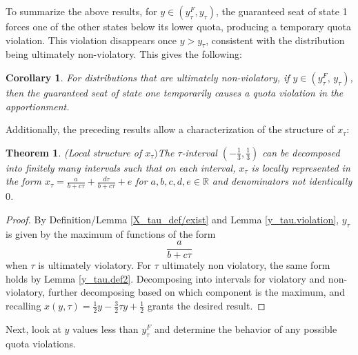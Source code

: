 \documentclass[11pt]{article}
\newtheorem{theorem}{Theorem}[section]
\newtheorem{corollary}{Corollary}[theorem]
\theoremstyle{definition}
\theoremstyle{definition}
\begin{document}
\noindent
To summarize the above results, for $y \in (y_\tau^F, y_\tau)$, the guaranteed seat of state 1 forces one of the other states below its lower quota, producing a temporary quota violation. This violation disappears once $y > y_\tau$, consistent with the distribution being ultimately non-violatory. This gives the following:

\begin{corollary}\label{J_t_c}
For distributions that are ultimately non-violatory, if $y \in (y_\tau^F, \,y_\tau)$, then the guaranteed seat of state one temporarily causes a quota violation in the apportionment.
\end{corollary}

Additionally, the preceding results allow a characterization of the structure of $x_\tau$:
\begin{theorem}(Local structure of $x_\tau)$\label{for_remark}
The $\tau$-interval $(-\frac{1}{3}, \frac{1}{3})$ can be decomposed into  finitely many intervals such that on each interval, $x_\tau$ is locally represented in the form $x_\tau =\frac{a}{b+c\tau} + \frac{d\tau}{b+c\tau} + e$ for $a,b,c,d,e \in \mathbb{R}$ and denominators not identically $0$.
\end{theorem}
\begin{proof}
By Definition/Lemma \ref{X_tau_def/exist} and Lemma \ref{y_tau.violation}, $y_\tau$ is given by the maximum of functions of the form
\[ \frac{a}{b+c\tau} \]
when $\tau$ is ultimately violatory. For $\tau$ ultimately non violatory, the same form holds by Lemma \ref{y_tau.def2}. Decomposing into intervals for violatory and non-violatory, further decomposing based on which component is the maximum, and recalling $x(y,\tau) = \frac{1}{2}y - \frac{3}{2}\tau y + \frac{1}{2}$ grants the desired result.
    
\end{proof}



Next, look at $y$ values less than $y_\tau^F$ and determine the behavior of any possible quota violations. 
\end{document}
